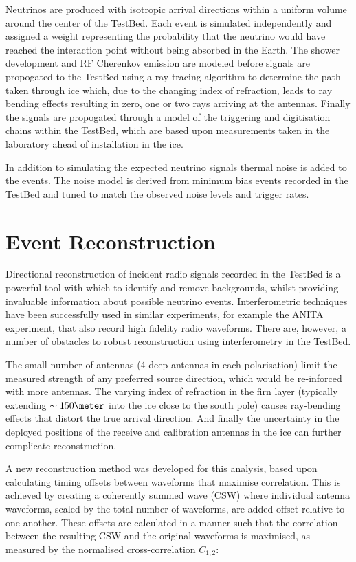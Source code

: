 Neutrinos are produced with isotropic arrival directions within a uniform volume around the center of the TestBed. Each event is simulated independently and assigned a weight representing the probability that the neutrino would have reached the interaction point without being absorbed in the Earth. The shower development and RF Cherenkov emission are modeled before signals are propogated to the TestBed using a ray-tracing algorithm to determine the path taken through ice which, due to the changing index of refraction, leads to ray bending effects resulting in zero, one or two rays arriving at the antennas. Finally the signals are propogated through a model of the triggering and digitisation chains within the TestBed, which are based upon measurements taken in the laboratory ahead of installation in the ice.

In addition to simulating the expected neutrino signals thermal noise is added to the events. The noise model is derived from minimum bias events recorded in the TestBed and tuned to match the observed noise levels and trigger rates. 


\section{Event Reconstruction}
\label{sec:Analysis:Reconstruction}

Directional reconstruction of incident radio signals recorded in the TestBed is a powerful tool with which to identify and remove backgrounds, whilst providing invaluable information about possible neutrino events. Interferometric techniques have been successfully used in similar experiments, for example the ANITA experiment, that also record high fidelity radio waveforms. There are, however, a number of obstacles to robust reconstruction using interferometry in the TestBed. 

The small number of antennas (4 deep antennas in each polarisation) limit the measured strength of any preferred source direction, which would be re-inforced with more antennas. The varying index of refraction in the firn layer (typically extending $\sim 150 \meter$ into the ice close to the south pole) causes ray-bending effects that distort the true arrival direction. And finally the uncertainty in the deployed positions of the receive and calibration antennas in the ice can further complicate reconstruction. 


A new reconstruction method was developed for this analysis, based upon calculating timing offsets between waveforms that maximise correlation. This is achieved by creating a coherently summed wave (CSW) where individual antenna waveforms, scaled by the total number of waveforms, are added offset relative to one another. These offsets are calculated in a manner such that the correlation between the resulting CSW and the original waveforms is maximised, as measured by the normalised cross-correlation $C_{1,2}$:


